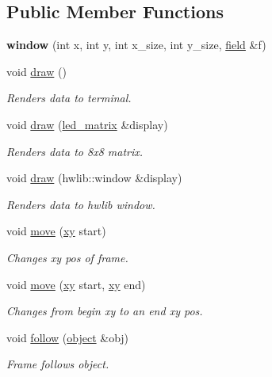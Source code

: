 \subsection*{Public Member Functions}
\begin{DoxyCompactItemize}
\item 
\mbox{\label{classwindow_a6ea85176a95779f23e6fa96c33dc7dfd}} 
{\bfseries window} (int x, int y, int x\+\_\+size, int y\+\_\+size, \hyperlink{classfield}{field} \&f)
\item 
void \hyperlink{classwindow_aaa5781da14047b439cd587935633ee6d}{draw} ()
\begin{DoxyCompactList}\small\item\em Renders data to terminal. \end{DoxyCompactList}\item 
void \hyperlink{classwindow_a405e7d2c0fcc62a7626c26e82b7a1ae4}{draw} (\hyperlink{classled__matrix}{led\+\_\+matrix} \&display)
\begin{DoxyCompactList}\small\item\em Renders data to 8x8 matrix. \end{DoxyCompactList}\item 
void \hyperlink{classwindow_a398eefc89f338540648fa779de957921}{draw} (hwlib\+::window \&display)
\begin{DoxyCompactList}\small\item\em Renders data to hwlib window. \end{DoxyCompactList}\item 
void \hyperlink{classwindow_aa32da017b225e569e0e3ca6974505873}{move} (\hyperlink{classxy}{xy} start)
\begin{DoxyCompactList}\small\item\em Changes xy pos of frame. \end{DoxyCompactList}\item 
void \hyperlink{classwindow_a6c22ca4ea83cd685762d6c7efb0f228a}{move} (\hyperlink{classxy}{xy} start, \hyperlink{classxy}{xy} end)
\begin{DoxyCompactList}\small\item\em Changes from begin xy to an end xy pos. \end{DoxyCompactList}\item 
void \hyperlink{classwindow_ae668127fa0e1ad8946dcac6a620042b7}{follow} (\hyperlink{classobject}{object} \&obj)
\begin{DoxyCompactList}\small\item\em Frame follows object. \end{DoxyCompactList}\item 

\end{DoxyCompactItemize}
